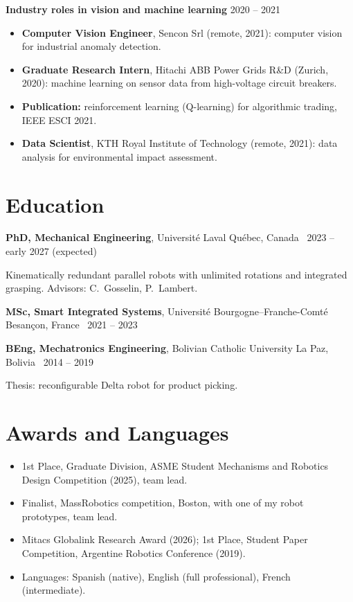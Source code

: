 \documentclass[10pt,a4paper]{article}
\begin{document}
\vspace{3pt}
\textbf{Industry roles in vision and machine learning} \hfill {\color{muted}2020 -- 2021}\par
\begin{itemize}
\item \textbf{Computer Vision Engineer}, Sencon Srl (remote, 2021): computer vision for industrial anomaly detection.
\item \textbf{Graduate Research Intern}, Hitachi ABB Power Grids R\&D (Zurich, 2020): machine learning on sensor data from high-voltage circuit breakers.
\item \textbf{Publication:} reinforcement learning (Q-learning) for algorithmic trading, IEEE ESCI 2021.
\item \textbf{Data Scientist}, KTH Royal Institute of Technology (remote, 2021): data analysis for environmental impact assessment.
\end{itemize}

\section{Education}
\textbf{PhD, Mechanical Engineering}, Universit\'e Laval \hfill {\color{muted}Qu\'ebec, Canada \textbar\ 2023 -- early 2027 (expected)}\par
{\small Kinematically redundant parallel robots with unlimited rotations and integrated grasping. Advisors: C.~Gosselin, P.~Lambert.}\par\vspace{2pt}
\textbf{MSc, Smart Integrated Systems}, Universit\'e Bourgogne--Franche-Comt\'e \hfill {\color{muted}Besan\c{c}on, France \textbar\ 2021 -- 2023}\par\vspace{2pt}
\textbf{BEng, Mechatronics Engineering}, Bolivian Catholic University \hfill {\color{muted}La Paz, Bolivia \textbar\ 2014 -- 2019}\par
{\small Thesis: reconfigurable Delta robot for product picking.}

\section{Awards and Languages}
\begin{itemize}
\item 1st Place, Graduate Division, ASME Student Mechanisms and Robotics Design Competition (2025), team lead.
\item Finalist, MassRobotics competition, Boston, with one of my robot prototypes, team lead.
\item Mitacs Globalink Research Award (2026); 1st Place, Student Paper Competition, Argentine Robotics Conference (2019).
\item Languages: Spanish (native), English (full professional), French (intermediate).
\end{itemize}
\end{document}
